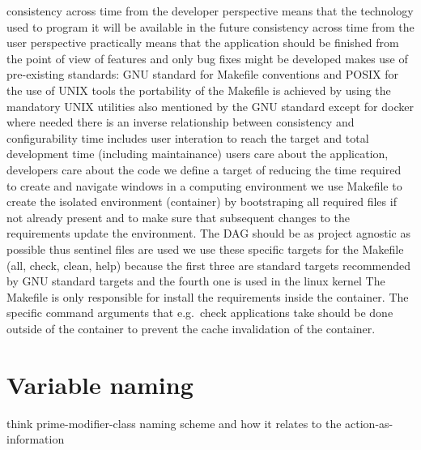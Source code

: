 \documentclass[journal]{IEEEtran}
\begin{document}
consistency across time from the developer perspective means that the technology used to program it will be available in the future
consistency across time from the user perspective practically means that the application should be finished from the point of view of features and only bug fixes might be developed
makes use of pre-existing standards: GNU standard for Makefile conventions and POSIX for the use of UNIX tools
the portability of the Makefile is achieved by using the mandatory UNIX utilities also mentioned by the GNU standard except for docker where needed
there is an inverse relationship between consistency and configurability
time includes user interation to reach the target and total development time (including maintainance)
users care about the application, developers care about the code
we define a target of reducing the time required to create and navigate windows in a computing environment
we use Makefile to create the isolated environment (container) by bootstraping all required files if not already present and to make sure that subsequent changes to the requirements update the environment. The DAG should be as project agnostic as possible thus sentinel files are used
we use these specific targets for the Makefile (all, check, clean, help) because the first three are standard targets recommended by GNU standard targets and the fourth one is used in the linux kernel
The Makefile is only responsible for install the requirements inside the container.
The specific command arguments that e.g.\ check applications take should be done outside of the container to prevent the cache invalidation of the container.

\section{Variable naming}
think prime-modifier-class naming scheme and how it relates to the action-as-information
\end{document}
